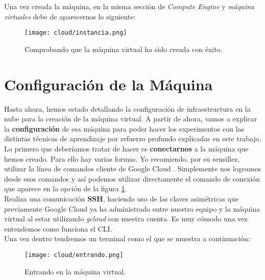 \documentclass[11pt,fleqn]{book} %
\begin{document}
Una vez creada la máquina, en la misma sección de \textit{Compute Engine} y \textit{máquina virtuales} debe de aparecernos lo siguiente:

\begin{figure}[H]
	\centering\texttt{[image: cloud/instancia.png]}
	\caption{Comprobando que la máquina virtual ha sido creada con éxito.}
	\label{fig:cloudinstancia} %
\end{figure} 

\section{Configuración de la Máquina}\label{sec:configuracionmaquina}

Hasta ahora, hemos estado detallando la configuración de infraestructura en la nube para la creación de la máquina virtual. A partir de ahora, vamos a explicar la \textbf{configuración} de esa máquina para poder hacer los experimentos con las distintas técnicas de aprendizaje por refuerzo profundo explicadas en este trabajo. \\

Lo primero que deberíamos tratar de hacer es \textbf{conectarnos} a la máquina que hemos creado. Para ello hay varias formas. Yo recomiendo, por su sensillez, utilizar la línea de comandos cliente de Google Cloud \cite{article:gcloud}. Simplemente nos logeamos desde esos comandos y así podemos utilizar directamente el comando de conexión que aparece en la opción de la figura \ref{fig:cloudinstancia}. \\

Realiza una comunicación \textbf{SSH}, haciendo uso de las claves asimétricas que previamente Google Cloud ya ha administrado entre nuestro equipo y la máquina virtual al estar utilizando \textit{gcloud} con nuestra cuenta. Es muy cómodo una vez entendemos como funciona el CLI. \\

Una vez dentro tendremos un terminal como el que se muestra a continuación: 

\begin{figure}[H]
	\centering\texttt{[image: cloud/entrando.png]}
	\caption{Entrando en la máquina virtual.}
	\label{fig:cloudentrando} %
\end{figure} 
\end{document}
